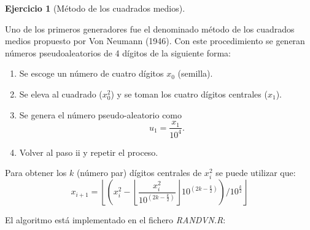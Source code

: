 \documentclass[
]{book}
\theoremstyle{break}
\theoremstyle{definition}
\theoremstyle{definition}
\theoremstyle{definition}
\newtheorem{exercise}{Ejercicio}[chapter]
\theoremstyle{definition}
\theoremstyle{remark}
\begin{document}
\begin{exercise}[Método de los cuadrados medios]
\protect\hypertarget{exr:RANDVN}{}{\label{exr:RANDVN} {} }
\end{exercise}
Uno de los primeros generadores fue el denominado método de los
cuadrados medios propuesto por Von Neumann (1946). Con este
procedimiento se generan números pseudoaleatorios de 4 dígitos de la
siguiente forma:

\begin{enumerate}
\def\labelenumi{\roman{enumi}.}
\item
  Se escoge un número de cuatro dígitos \(x_0\) (semilla).
\item
  Se eleva al cuadrado (\(x_0^2\)) y se toman los cuatro dígitos centrales (\(x_1\)).
\item
  Se genera el número pseudo-aleatorio como \[u_1=\frac{x_1}{10^{4}}.\]
\item
  Volver al paso ii y repetir el proceso.
\end{enumerate}

Para obtener los \(k\) (número par) dígitos centrales de \(x_{i}^2\)
se puede utilizar que:
\[x_{i+1}=\left\lfloor \left(  x_{i}^2-\left\lfloor \dfrac{x_{i}^2}{10^{(2k-\frac{k}2)}}\right\rfloor 10^{(2k-\frac{k}2)}\right)
/10^{\frac{k}2}\right\rfloor\]

El algoritmo está implementado en el fichero \emph{RANDVN.R}:
\end{document}
